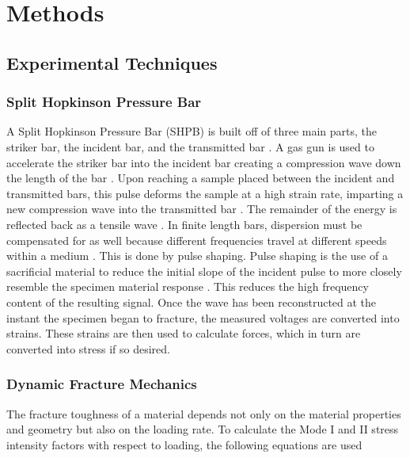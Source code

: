 \documentclass[12pt]{article}
\begin{document}
\section{Methods}

\subsection{Experimental Techniques} 

\subsubsection {Split Hopkinson Pressure Bar} %

A Split Hopkinson Pressure Bar (SHPB) is built off of three main parts, the striker bar, the incident bar, and the transmitted bar \cite{Frew} \cite{Frew2002}. A gas gun is used to accelerate the striker bar into the incident bar creating a compression wave down the length of the bar \cite{Frew}. Upon reaching a sample placed between the incident and transmitted bars, this pulse deforms the sample at a high strain rate, imparting a new compression wave into the transmitted bar \cite{Dai}. The remainder of the energy is reflected back as a tensile wave \cite{Gama}. In finite length bars, dispersion must be compensated for as well because different frequencies travel at different speeds within a medium \cite{Gama}. This is done by pulse shaping. Pulse shaping is the use of a sacrificial material to reduce the initial slope of the incident pulse to more closely resemble the specimen material response \cite{Frew2002}. This reduces the high frequency content of the resulting signal. Once the wave has been reconstructed at the instant the specimen began to fracture, the measured voltages are converted into strains. These strains are then used to calculate forces, which in turn are converted into stress if so desired. 

\subsubsection{Dynamic Fracture Mechanics} %

The fracture toughness of a material depends not only on the material properties and geometry but also on the loading rate. To calculate the Mode I and II stress intensity factors with respect to loading, the following equations are used
\end{document}
